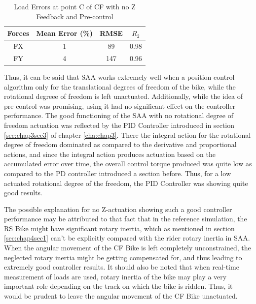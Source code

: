 \begin{table}[h!]
	\centering
	\begin{tabular}{ |c|c|c|c| } 
		\hline
		Forces & Mean Error (\%) & RMSE & $R_2$\\ 
		\hline
		FX & 1&89&0.98\\ 
		FY & 4&147&0.96 \\ 
		\hline
	\end{tabular}
	\caption{Load Errors at point C of CF with no Z Feedback and Pre-control}
	\label{tab:noZC}
\end{table}

Thus, it can be said that SAA works extremely well when a position control algorithm only for the translational degrees of freedom of the bike, while the rotational degreee of freedom is left unactuated. Additionally, while the idea of pre-control was promising, using it had no significant effect on the controller performance.
The good functioning of the SAA with no rotational degree of freedom actuation was reflected by the PID Controller introduced in section \ref{sec:chap3sec3} of chapter \ref{cha:chap3}. There the integral action for the rotational degree of freedom dominated as compared to the derivative and proportional actions, and since the integral action produces actuation based on the accumulated error over time, the overall control torque produced was quite low as compared to the PD controller introduced a section before. Thus, for a low actuated rotational degree of the freedom, the PID Controller was showing quite good results.

The possible explanation for no Z-actuation showing such a good controller performance may be attributed to that fact that in the reference simulation, the RS Bike might have significant rotary inertia, which as mentioned in section \ref{sec:chap4sec1} can't be explicitly compared with the rider rotary inertia in SAA. When the angular movement of the CF Bike is left completely unconstrained, the neglected rotary inertia might be getting compensated for, and thus leading to extremely good controller results. It should also be noted that when real-time measurement of loads are used, rotary inertia of the bike may play a very important role depending on the track on which the bike is ridden. Thus, it would be prudent to leave the angular movement of the CF Bike unactuated.
